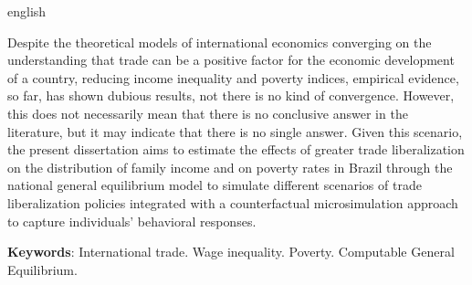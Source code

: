 

\begin{resumo}[Abstract]
	\begin{otherlanguage*}{english}
		\SingleSpacing
		
		Despite the theoretical models of international economics converging on the understanding that trade can be a positive factor for the economic development of a country, reducing income inequality and poverty indices, empirical evidence, so far, has shown dubious results, not there is no kind of convergence. However, this does not necessarily mean that there is no conclusive answer in the literature, but it may indicate that there is no single answer. Given this scenario, the present dissertation aims to estimate the effects of greater trade liberalization on the distribution of family income and on poverty rates in Brazil through the national general equilibrium model to simulate different scenarios of trade liberalization policies integrated with a counterfactual microsimulation approach to capture individuals' behavioral responses.
		
		\noindent 
		\textbf{Keywords}: International trade. Wage inequality. Poverty. Computable General Equilibrium.
	\end{otherlanguage*}
\end{resumo}


